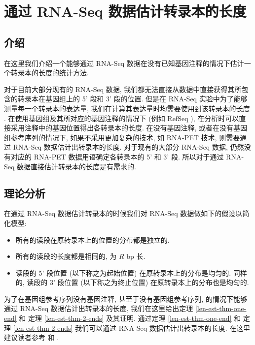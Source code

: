 \chapter{通过 RNA-Seq 数据估计转录本的长度}
\label{chap-lenest}

\section{介绍}
在这里我们介绍一个能够通过 RNA-Seq 数据在没有已知基因注释的情况下估计一个转录本的长度的统计方法. 

对于目前大部分现有的 RNA-Seq 数据, 
我们都无法直接从数据中直接获得其所包含的转录本在基因组上的 5' 段和 3' 段的位置. 
但是在 RNA-Seq 实验中为了能够测量每一个转录本的表达量, 
我们在计算其表达量时均需要使用到该转录本的长度 
\cite{mortazavi2008mapping, Jiang15042009, cufflinks.2010}. 
在使用基因组及其所对应的基因注释的情况下 (例如 RefSeq \cite{_refseq}), 
在分析时可以直接采用注释中的基因位置得出各转录本的长度. 
在没有基因注释, 或者在没有基因组参考序列的情况下, 
如果不采用更加复杂的技术, 如 RNA-PET \cite{Fullwood01042009} 技术, 
则需要通过 RNA-Seq 数据估计出转录本的长度. 对于现有的大部分 RNA-Seq 数据, 
仍然没有对应的 RNA-PET 数据用语确定各转录本的 5' 和 3' 段. 
所以对于通过 RNA-Seq 数据直接估计转录本的长度是有需求的. 

\section{理论分析}
在通过 RNA-Seq 数据估计转录本的时候我们对 RNA-Seq 数据做如下的假设以简化模型: 
\begin{itemize}
\item 所有的读段在原转录本上的位置的分布都是独立的. 

\item 所有的读段的长度都是相同的, 为 $R$ bp 长.

\item 读段的 5' 段位置 (以下称之为起始位置) 在原转录本上的分布是均匀的. 
同样的, 读段的 3' 段位置 (以下称之为终止位置) 在原转录本上的分布也是均匀的. 
\end{itemize}

为了在基因组参考序列没有基因注释, 甚至于没有基因组参考序列, 
的情况下能够通过 RNA-Seq 数据估计出转录本的长度, 
我们在这里给出定理 \ref{len-est-thm-one-end} 和 
定理 \ref{len-est-thm-2-ends} 及其证明. 
通过定理 \ref{len-est-thm-one-end} 和 
定理 \ref{len-est-thm-2-ends} 
我们可以通过 RNA-Seq 数据估计出转录本的长度. 
在这里建议读者参考  
和 . 


